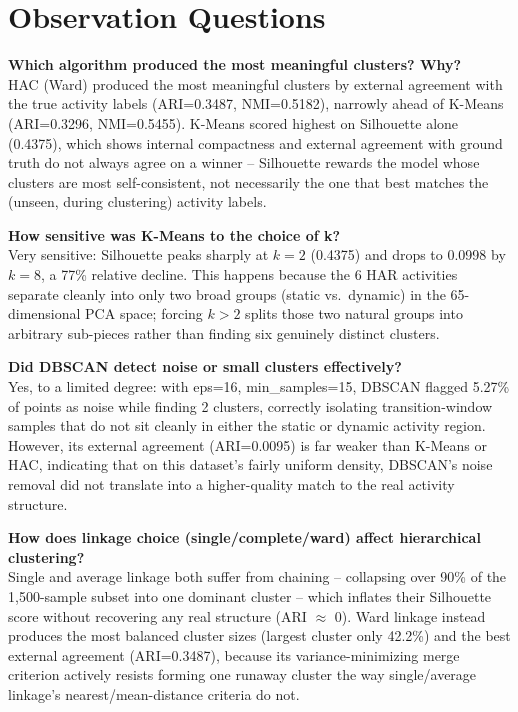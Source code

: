 \documentclass[11pt,a4paper]{article}
\begin{document}
\section{Observation Questions}

\textbf{Which algorithm produced the most meaningful clusters? Why?}\\
HAC (Ward) produced the most meaningful clusters by external agreement with the true activity labels (ARI=0.3487, NMI=0.5182), narrowly ahead of K-Means (ARI=0.3296, NMI=0.5455). K-Means scored highest on Silhouette alone (0.4375), which shows internal compactness and external agreement with ground truth do not always agree on a winner -- Silhouette rewards the model whose clusters are most self-consistent, not necessarily the one that best matches the (unseen, during clustering) activity labels.

\textbf{How sensitive was K-Means to the choice of k?}\\
Very sensitive: Silhouette peaks sharply at $k=2$ (0.4375) and drops to 0.0998 by $k=8$, a 77\% relative decline. This happens because the 6 HAR activities separate cleanly into only two broad groups (static vs.\ dynamic) in the 65-dimensional PCA space; forcing $k>2$ splits those two natural groups into arbitrary sub-pieces rather than finding six genuinely distinct clusters.

\textbf{Did DBSCAN detect noise or small clusters effectively?}\\
Yes, to a limited degree: with eps=16, min\_samples=15, DBSCAN flagged 5.27\% of points as noise while finding 2 clusters, correctly isolating transition-window samples that do not sit cleanly in either the static or dynamic activity region. However, its external agreement (ARI=0.0095) is far weaker than K-Means or HAC, indicating that on this dataset's fairly uniform density, DBSCAN's noise removal did not translate into a higher-quality match to the real activity structure.

\textbf{How does linkage choice (single/complete/ward) affect hierarchical clustering?}\\
Single and average linkage both suffer from chaining -- collapsing over 90\% of the 1,500-sample subset into one dominant cluster -- which inflates their Silhouette score without recovering any real structure (ARI $\approx$ 0). Ward linkage instead produces the most balanced cluster sizes (largest cluster only 42.2\%) and the best external agreement (ARI=0.3487), because its variance-minimizing merge criterion actively resists forming one runaway cluster the way single/average linkage's nearest/mean-distance criteria do not.
\end{document}
